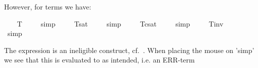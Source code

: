 \begin{isabellebody}
%
\endisatagproof
{\isafoldproof}%
%
\isadelimproof
%
\endisadelimproof
%
\begin{isamarkuptext}%
However, for terms we have:%
\end{isamarkuptext}%
\isamarkuptrue%
\ \isamarkupfalse%
\ \ {\isachardoublequoteopen}{\isacharbrackleft}{\isasymphi}\isactrlsup T{\isacharbrackright}\ {\isacharequal}\ {\isacharasterisk}{\isachardoublequoteclose}%
\isadelimproof
\ %
\endisadelimproof
%
\isatagproof
{}\isamarkupfalse%
\ simp\ \isamarkupfalse%
%
\endisatagproof
{\isafoldproof}%
%
\isadelimproof
%
\endisadelimproof
\isanewline
\ \isamarkupfalse%
\ \ {\isachardoublequoteopen}{\isacharbrackleft}{\isasymphi}\isactrlsup T{\isacharbrackright}\isactrlsup s\isactrlsup a\isactrlsup t\ {\isacharequal}\ {\isacharasterisk}{\isachardoublequoteclose}%
\isadelimproof
\ %
\endisadelimproof
%
\isatagproof
{}\isamarkupfalse%
\ simp\ \isamarkupfalse%
%
\endisatagproof
{\isafoldproof}%
%
\isadelimproof
%
\endisadelimproof
\isanewline
\ \isamarkupfalse%
\ \ {\isachardoublequoteopen}{\isacharbrackleft}{\isasymphi}\isactrlsup T{\isacharbrackright}\isactrlsup c\isactrlsup s\isactrlsup a\isactrlsup t\ {\isacharequal}\ {\isacharasterisk}{\isachardoublequoteclose}%
\isadelimproof
\ %
\endisadelimproof
%
\isatagproof
{}\isamarkupfalse%
\ simp\ \isamarkupfalse%
%
\endisatagproof
{\isafoldproof}%
%
\isadelimproof
%
\endisadelimproof
\isanewline
\ \isamarkupfalse%
\ \ {\isachardoublequoteopen}{\isacharbrackleft}{\isasymphi}\isactrlsup T{\isacharbrackright}\isactrlsup i\isactrlsup n\isactrlsup v\ {\isacharequal}\ {\isacharasterisk}{\isachardoublequoteclose}%
\isadelimproof
\ %
\endisadelimproof
%
\isatagproof
{}\isamarkupfalse%
\ simp\ \isamarkupfalse%
%
\endisatagproof
{\isafoldproof}%
%
\isadelimproof
%
\endisadelimproof
%
\isamarkuptrue%
%
\begin{isamarkuptext}%
The expression  is an ineligible 
 construct, cf.~\cite[chap.4]{zalta11:_relat_versus_funct_found_logic}. 
 When placing the
 mouse on 'simp' we see that this is evaluated to  as intended, i.e. an ERR-term

\end{isamarkuptext}
\end{isabellebody}
